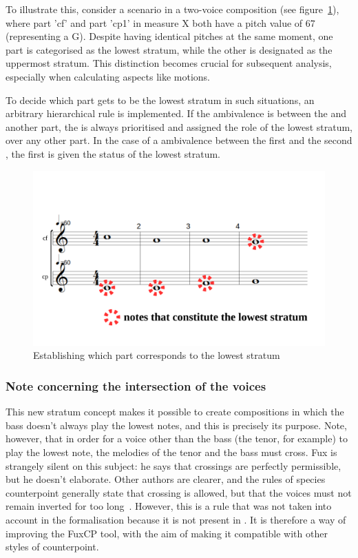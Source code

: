To illustrate this, consider a scenario in a two-voice composition (see figure~\ref{fig:one-voice-max-can-be-a}), where part 'cf' and part 'cp1' in measure X both have a pitch value of 67 (representing a G). Despite having identical pitches at the same moment, one part is categorised as the lowest stratum, while the other is designated as the uppermost stratum. This distinction becomes crucial for subsequent analysis, especially when calculating aspects like motions.

To decide which part gets to be the lowest stratum in such situations, an arbitrary hierarchical rule is implemented. If the ambivalence is between the \cfs and another part, the \cfs is always prioritised and assigned the role of the lowest stratum, over any other part. In the case of a ambivalence between the first \cps and the second \cp, the first \cps is given the status of the lowest stratum. 

\begin{figure}[h]
    \centering
    \includegraphics[width=.5\textwidth]{Images/one-voice-max-can-be-a.png}
    \caption{Establishing which part corresponds to the lowest stratum}
    \label{fig:one-voice-max-can-be-a}
  \end{figure}

\subsubsection{Note concerning the intersection of the voices}
This new stratum concept makes it possible to create compositions in which the bass doesn't always play the lowest notes, and this is precisely its purpose. Note, however, that in order for a voice other than the bass (the tenor, for example) to play the lowest note, the melodies of the tenor and the bass must cross. Fux is strangely silent on this subject: he says that crossings are perfectly permissible, but he doesn't elaborate. Other authors are clearer, and the rules of species counterpoint generally state that crossing is allowed, but that the voices must not remain inverted for too long~\cite[p.28]{Bitsch}. However, this is a rule that was not taken into account in the formalisation because it is not present in \gap. It is therefore a way of improving the FuxCP tool, with the aim of making it compatible with other styles of counterpoint.

